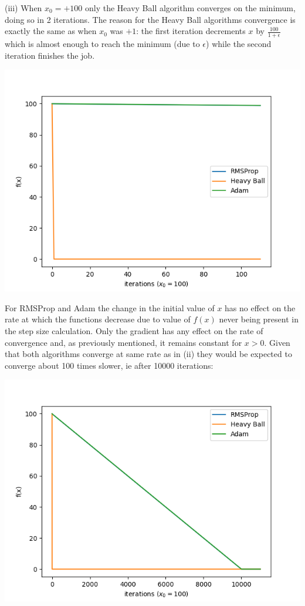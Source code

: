 \documentclass[12pt]{article}
\begin{document}
\noindent (iii) When $x_0=+100$ only the Heavy Ball algorithm converges on the minimum, doing so in 2 iterations. The reason for the Heavy Ball algorithms convergence is exactly the same as when $x_0$ was $+1$: the first iteration decrements $x$ by $\frac{100}{1+\epsilon}$ which is almost enough to reach the minimum (due to $\epsilon$) while the second iteration finishes the job.

\begin{center}
    \includegraphics[scale=0.6]{figs/c/c_iii.png}
\end{center}

For RMSProp and Adam the change in the initial value of $x$ has no effect on the rate at which the functions decrease due to value of $f(x)$ never being present in the step size calculation. Only the gradient has any effect on the rate of convergence and, as previously mentioned, it remains constant for $x > 0$. Given that both algorithms converge at same rate as in (ii) they would be expected to converge about 100 times slower, ie after 10000 iterations:

\begin{center}
    \includegraphics[scale=0.6]{figs/c/c_iii_10k.png}
\end{center}
\end{document}
